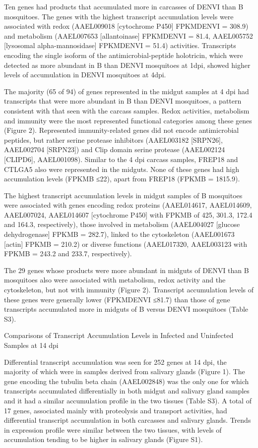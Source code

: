 Ten genes had products that accumulated more in carcasses of DENVI than B mosquitoes.
The genes with the highest transcript accumulation levels were associated with redox (AAEL009018 [cytochrome P450] FPKMDENVI = 308.9) and metabolism (AAEL007653 [allantoinase] FPKMDENVI = 81.4, AAEL005752 [lysosomal alpha-mannosidase] FPKMDENVI = 51.4) activities.
Transcripts encoding the single isoform of the antimicrobial-peptide holotricin, which were detected as more abundant in B than DENVI mosquitoes at 1dpi, showed higher levels of accumulation in DENVI mosquitoes at 4dpi.

The majority (65 of 94) of genes represented in the midgut samples at 4 dpi had transcripts that were more abundant in B than DENVI mosquitoes, a pattern consistent with that seen with the carcass samples.
Redox activities, metabolism and immunity were the most represented functional categories among these genes (Figure 2).
Represented immunity-related genes did not encode antimicrobial peptides, but rather serine protease inhibitors (AAEL003182 [SRPN26], AAEL002704 [SRPN23]) and Clip domain serine protease (AAEL002124 [CLIPD6], AAEL001098).
Similar to the 4 dpi carcass samples, FREP18 and CTLGA5 also were represented in the midguts.
None of these genes had high accumulation levels (FPKMB ≤22), apart from FREP18 (FPKMB = 1815.9).

The highest transcript accumulation levels in midgut samples of B mosquitoes were associated with genes encoding redox proteins (AAEL014617, AAEL014609, AAEL007024, AAEL014607 [cytochrome P450] with FPKMB of 425, 301.3, 172.4 and 164.3, respectively), those involved in metabolism (AAEL004027 [glucose dehydrogenase] FPKMB = 282.7), linked to the cytoskeleton (AAEL001673 [actin] FPKMB = 210.2) or diverse functions (AAEL017320, AAEL003123 with FPKMB = 243.2 and 233.7, respectively).

The 29 genes whose products were more abundant in midguts of DENVI than B mosquitoes also were associated with metabolism, redox activity and the cytoskeleton, but not with immunity (Figure 2).
Transcript accumulation levels of these genes were generally lower (FPKMDENVI ≤81.7) than those of gene transcripts accumulated more in midguts of B versus DENVI mosquitoes (Table S3).

Comparisons of Transcript Accumulation Levels in Infected and Uninfected Samples at 14 dpi

Differential transcript accumulation was seen for 252 genes at 14 dpi, the majority of which were in samples derived from salivary glands (Figure 1).
The gene encoding the tubulin beta chain (AAEL002848) was the only one for which transcripts accumulated differentially in both midgut and salivary gland samples and it had a similar accumulation profile in the two tissues (Table S3).
A total of 17 genes, associated mainly with proteolysis and transport activities, had differential transcript accumulation in both carcasses and salivary glands.
Trends in expression profile were similar between the two tissues, with levels of accumulation tending to be higher in salivary glands (Figure S1).

